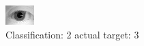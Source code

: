 \begin{figure}[h!]
\begin{center}
\includegraphics[width=0.60\columnwidth]{figures/ID1132_class_2_target_3.png}
\end{center}
\caption{ Classification: 2 actual target: 3}
\label{fig:ID1132_class_2_target_3}
\end{figure}
